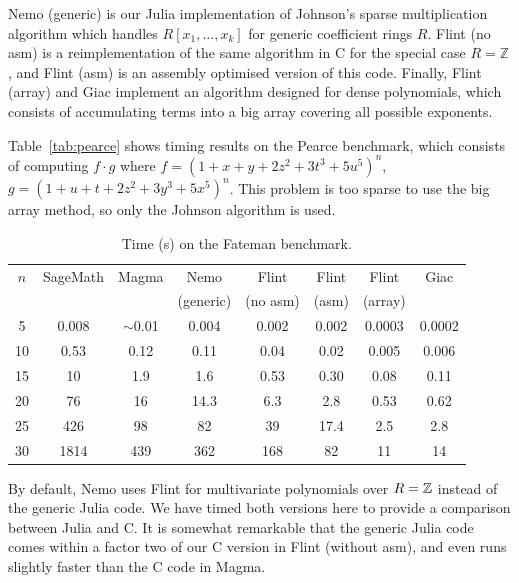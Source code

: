 \documentclass{sig-alternate-05-2015}
\begin{document}
Nemo (generic) is our Julia implementation of Johnson's sparse
multiplication algorithm which handles $R[x_1,\ldots,x_k]$
for generic coefficient rings $R$.
Flint (no asm) is a reimplementation of the same
algorithm in C for the special case $R = \mathbb{Z}$,
and Flint (asm) is an assembly optimised version of this code.
Finally, Flint (array) and Giac implement an algorithm designed
for dense polynomials, which consists of accumulating terms
into a big array covering all possible exponents.

Table~\ref{tab:pearce} shows timing results on the Pearce
benchmark, which consists of computing $f \cdot g$ where
$f = (1 + x + y + 2z^2 + 3t^3 + 5u^5)^n$,
$g = (1 + u + t + 2z^2 + 3y^3 + 5x^5)^n$.
This problem is too sparse to use the big array method,
so only the Johnson algorithm is used.

\begin{table}
\center
\caption{Time (s) on the Fateman benchmark.}
\begin{small}
\setlength{\tabcolsep}{2.5pt}
\renewcommand{\arraystretch}{1.15}
\begin{tabular}{c c c c c c c c} \hline
$n$ & SageMath & Magma & Nemo & Flint & Flint & Flint & Giac \\ 
    &          &       & (generic) & (no asm) & (asm) & (array) & \\ \hline
     5  &  0.008 & $\sim$0.01   & 0.004      &        0.002    &        0.002       &      0.0003    &    0.0002 \\
    10  &  0.53  &   0.12  &   0.11     &         0.04    &         0.02       &         0.005   &      0.006 \\
    15  &   10   &    1.9  &      1.6   &         0.53    &          0.30      &           0.08   &         0.11 \\
    20  &   76   &    16   &    14.3    &          6.3    &            2.8     &            0.53   &         0.62 \\
    25  &  426   &   98    &      82    &          39     &         17.4        &           2.5     &         2.8 \\
    30  & 1814   & 439     &  362       &         168     &            82        &            11     &          14 \\
\end{tabular}
\label{tab:fateman}
\end{small}
\end{table}

By default, Nemo uses Flint for multivariate polynomials
over $R = \mathbb{Z}$ instead of the generic
Julia code.
We have timed both versions here
to provide a comparison between Julia and C.
It is somewhat remarkable that the generic Julia code comes
within a factor two of our C version in Flint (without asm),
and even runs slightly faster than the C code in Magma.
\end{document}
